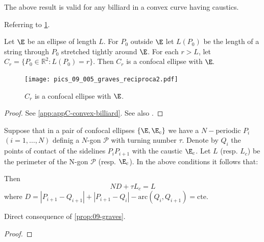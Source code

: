   The  above result is valid for any billiard in a convex curve having caustics. 
 
Referring to \cref{fig:09-reciproca-graves}.
      
\begin{proposition}
   Let $\E$ be an ellipse of length $L$.
   For $P_0$  outside $\E$ let $L(P_0)$   be the length of a string through $P_0$ stretched tightly around $\E$. For each $r>L$, let $C_r=\{P_0\in\mathbb{R}^2: L(P_0)=r\}.$  Then $C_r$ is a confocal ellipse with $\E.$ 
\label{prop:09-caustic}
\end{proposition} 
      
\begin{figure}
\begin{center}
\texttt{[image: pics\_09\_005\_graves\_reciproca2.pdf]}
\caption{$C_r$ is a confocal  ellipse with $\E$.}
\end{center}
\label{fig:09-reciproca-graves}
\end{figure}

\begin{proof} See \cref{app:appC-convex-billiard}. 
See also \cite[page 14]{akopyan2007-conics}.
\end{proof}

   Suppose that in a pair of confocal ellipses $\{\E,\E_c \}$ we have a $N-$periodic $P_i$ $(i=1,\ldots, N)$ definig a $N$-gon $\mathcal{P}$ with turning number $\tau$. Denote by $Q_i$ the points of contact of the sidelines $P_iP_{i+1}$ with the caustic $\E_c$. Let $L$ (resp. $L_c$) be the perimeter of the N-gon $\mathcal{P}$ (resp. $\E_c$). In the above conditions it follows that:
   
\begin{proposition}
   Then \[N D +\tau L_c= L\]
   where $D=|P_{i+1}-Q_{i+1}|+|P_{i+1}-Q_i|-\text{arc}(Q_i,Q_{i+1})=\text{cte}$.
  \label{prop:09-relacao-caustica} 
\end{proposition}
Direct consequence of \cref{prop:09-graves}.
\begin{proof}

\end{proof}